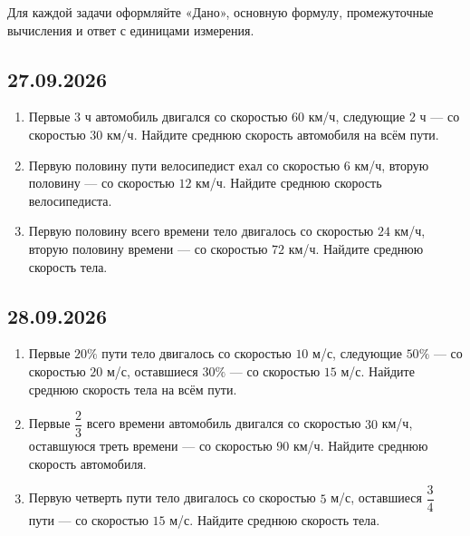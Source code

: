 \documentclass[a4paper,12pt]{article}
\begin{document}
Для каждой задачи оформляйте «Дано», основную формулу, промежуточные вычисления и ответ с единицами измерения.

\subsection*{27.09.2026}

\begin{enumerate}[
  label=\textbf{\arabic*.},
  leftmargin=8mm,
  itemsep=8pt
]

\item
Первые $3$ ч автомобиль двигался со скоростью $60$ км/ч, следующие $2$ ч --- со скоростью $30$ км/ч. Найдите среднюю скорость автомобиля на всём пути.

\item
Первую половину пути велосипедист ехал со скоростью $6$ км/ч, вторую половину --- со скоростью $12$ км/ч. Найдите среднюю скорость велосипедиста.

\item
Первую половину всего времени тело двигалось со скоростью $24$ км/ч, вторую половину времени --- со скоростью $72$ км/ч. Найдите среднюю скорость тела.

\end{enumerate}

\subsection*{28.09.2026}

\begin{enumerate}[
  label=\textbf{\arabic*.},
  leftmargin=8mm,
  itemsep=8pt
]

\item
Первые $20\%$ пути тело двигалось со скоростью $10$ м/с, следующие $50\%$ --- со скоростью $20$ м/с, оставшиеся $30\%$ --- со скоростью $15$ м/с. Найдите среднюю скорость тела на всём пути.

\item
Первые $\dfrac{2}{3}$ всего времени автомобиль двигался со скоростью $30$ км/ч, оставшуюся треть времени --- со скоростью $90$ км/ч. Найдите среднюю скорость автомобиля.

\item
Первую четверть пути тело двигалось со скоростью $5$ м/с, оставшиеся $\dfrac{3}{4}$ пути --- со скоростью $15$ м/с. Найдите среднюю скорость тела.

\end{enumerate}
\end{document}
